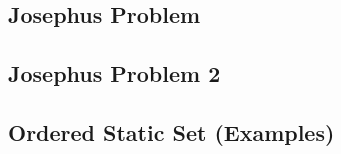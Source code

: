 \subsection{Josephus Problem}
\raggedbottom
\hrulefill
\subsection{Josephus Problem 2}
\raggedbottom
\hrulefill
\subsection{Ordered Static Set (Examples)}
\raggedbottom
\hrulefill

